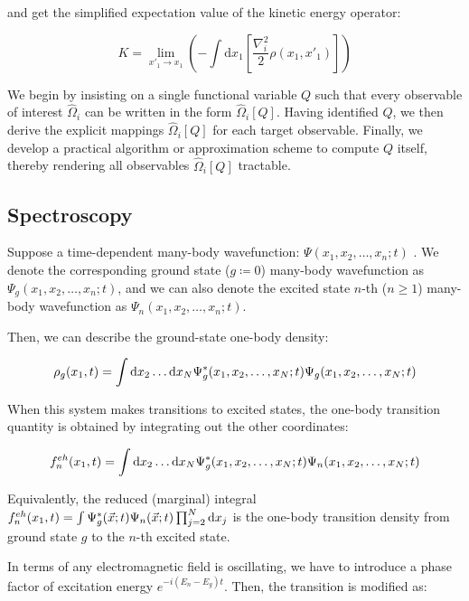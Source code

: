 and get the simplified expectation value of the kinetic energy operator:

\begin{equation}
K= \lim_{x'_1\to x_1}\left( -\int\mathrm{d}x_1\left[\frac{\nabla_i^2}{2}\rho(x_1,x'_1) \right]\right)
\label{kinetic_energy_density_matrix}
\end{equation}

We begin by insisting on a single functional variable $Q$ such that every observable of interest $\hat\Omega_i$ can be written in the form $\hat\Omega_i[Q]$. Having identified $Q$, we then derive the explicit mappings $\hat\Omega_i[Q]$ for each target observable. Finally, we develop a practical algorithm or approximation scheme to compute $Q$ itself, thereby rendering all observables $\hat\Omega_i[Q]$ tractable.


\subsection{Spectroscopy}

Suppose a time-dependent many-body wavefunction: $\Psi(x_1,x_2,\dots,x_n;t)$ . We denote the corresponding ground state ($g\coloneqq0$) many-body wavefunction as $\Psi_g(x_1,x_2,\dots,x_n;t)$, and we can also denote the excited state $n$-th ($n\geq1$) many-body wavefunction as $\Psi_n(x_1,x_2,\dots,x_n;t)$.

Then, we can describe the ground-state one-body density:

\begin{equation}
\rho_g(x_1,t)=\int {\rm d}x_2\dots{\rm d}x_N\Psi_g^*(x_1,x_2,\dots,x_N;t)\Psi_g(x_1,x_2,\dots,x_N;t)
\label{ground_one-body_density}
\end{equation}

When this system makes transitions to excited states, the one-body transition quantity is obtained by integrating out the other coordinates:

\begin{equation}
f_n^{eh}(x_1,t)=\int {\rm d}x_2\dots{\rm d}x_N\Psi_g^*(x_1,x_2,\dots,x_N;t)\Psi_n(x_1,x_2,\dots,x_N;t)
\label{transition_one-body}
\end{equation}

Equivalently, the reduced (marginal) integral $f_n^{eh}(x_1,t)=\int\Psi_g^*(\vec{x};t)\Psi_n(\vec{x};t)\prod^N_{j=2}{\rm d}x_j$ is the one-body transition density from ground state $g$ to the $n$-th excited state.

In terms of any electromagnetic field is oscillating, we have to introduce a phase factor of excitation energy $e^{-i(E_n-E_g)t}$. Then, the transition is modified as:

